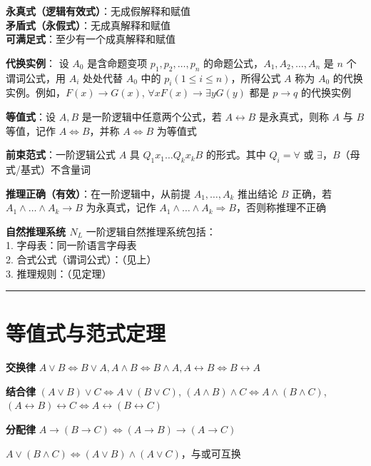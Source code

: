 \fontsize{6pt}{7pt}
\textbf{永真式（逻辑有效式）}：无成假解释和赋值\\
\textbf{矛盾式（永假式）}：无成真解释和赋值\\
\textbf{可满足式}：至少有一个成真解释和赋值

\textbf{代换实例}：
设 $A_0$ 是含命题变项 $p_1, p_2, \ldots, p_n$ 的命题公式，$A_1, A_2, \ldots, A_n$ 是 $n$ 个谓词公式，用 $A_i$ 处处代替 $A_0$ 中的 $p_i (1 \leq i \leq n)$，所得公式 $A$ 称为 $A_0$ 的代换实例。例如，$F(x) \rightarrow G(x)$, $\forall x F(x) \rightarrow \exists y G(y)$ 都是 $p \rightarrow q$ 的代换实例

\textbf{等值式}：设 $A, B$ 是一阶逻辑中任意两个公式，若 $A \leftrightarrow B$ 是永真式，则称 $A$ 与 $B$ 等值，记作 $A  \Leftrightarrow B$，并称 $A  \Leftrightarrow B$ 为等值式

\textbf{前束范式}：一阶逻辑公式 $A$ 具 $Q_{1} x_{1} \ldots Q_{k} x_{k} B$ 的形式。其中 $Q_{i} = \forall$ 或 $\exists$，$B$（母式/基式）不含量词

\textbf{推理正确（有效）}：在一阶逻辑中，从前提 $A_1, \ldots, A_k$ 推出结论 $B$ 正确，若 $A_{1} \land \ldots \land A_{k} \rightarrow B$ 为永真式，记作 $A_{1} \land \ldots \land A_{k} \Rightarrow B$，否则称推理不正确

\textbf{自然推理系统 $N_L$}
一阶逻辑自然推理系统包括：\\
1. 字母表：同一阶语言字母表\\
2. 合式公式（谓词公式）：（见上）\\
3. 推理规则：（见定理）


\hrule

\section*{等值式与范式定理}

\textbf{交换律} $A \vee B  \Leftrightarrow B \vee A, A \land B  \Leftrightarrow B \land A, A \leftrightarrow B  \Leftrightarrow B \leftrightarrow A$

\textbf{结合律} $(A \vee B) \vee C  \Leftrightarrow A \vee (B \vee C)$, $(A \land B) \land C  \Leftrightarrow A \land (B \land C)$, $(A \leftrightarrow B) \leftrightarrow C  \Leftrightarrow A \leftrightarrow (B \leftrightarrow C)$

\textbf{分配律} $A \rightarrow (B \rightarrow C)  \Leftrightarrow (A \rightarrow B) \rightarrow (A \rightarrow C)$

$A \vee (B \land C)  \Leftrightarrow (A \vee B) \land (A \vee C)$，与或可互换

